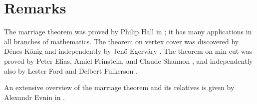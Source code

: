 \section*{Remarks}

The marriage theorem was proved by Philip Hall in \cite{hall};
it has many applications in all branches of mathematics.
The theorem on vertex cover was discovered by D\'enes K\H{o}nig \cite{konig} and independently by Jen\H{o} Egerv\'ary \cite{egervary}.
The theorem on min-cut was proved by Peter Elias, Amiel Feinstein, and Claude Shannon \cite{EFS}, 
and independently also by Lester Ford and Delbert Fulkerson \cite{ford-fulkerson}.

An extensive overview of the marriage theorem and its relatives is given by Alexandr Evnin in \cite{evnin}.
